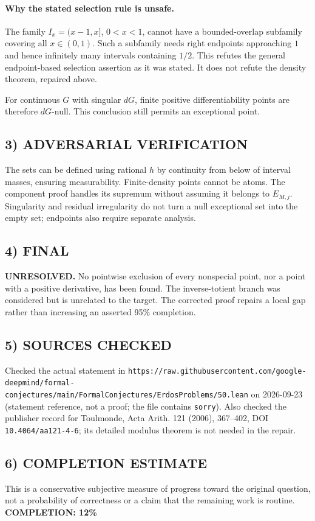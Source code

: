 \paragraph{Why the stated selection rule is unsafe.}
The family $I_x=(x-1,x]$, $0<x<1$, cannot have a bounded-overlap subfamily covering all $x\in(0,1)$. Such a subfamily needs right endpoints approaching $1$ and hence infinitely many intervals containing $1/2$. This refutes the general endpoint-based selection assertion as it was stated. It does not refute the density theorem, repaired above.

For continuous $G$ with singular $dG$, finite positive differentiability points are therefore $dG$-null. This conclusion still permits an exceptional point.
\subsection{3) ADVERSARIAL VERIFICATION}
The sets can be defined using rational $h$ by continuity from below of interval masses, ensuring measurability. Finite-density points cannot be atoms. The component proof handles its supremum without assuming it belongs to $E_{M,j}$. Singularity and residual irregularity do not turn a null exceptional set into the empty set; endpoints also require separate analysis.
\subsection{4) FINAL}
\textbf{UNRESOLVED.}
No pointwise exclusion of every nonspecial point, nor a point with a positive derivative, has been found. The inverse-totient branch was considered but is unrelated to the target. The corrected proof repairs a local gap rather than increasing an asserted 95\% completion.
\subsection{5) SOURCES CHECKED}
Checked the actual statement in \texttt{https://raw.githubusercontent.com/google-deepmind/formal-conjectures/main/FormalConjectures/ErdosProblems/50.lean} on 2026-09-23 (statement reference, not a proof; the file contains \texttt{sorry}). Also checked the publisher record for Toulmonde, Acta Arith. 121 (2006), 367--402, DOI \texttt{10.4064/aa121-4-6}; its detailed modulus theorem is not needed in the repair.
\subsection{6) COMPLETION ESTIMATE}
This is a conservative subjective measure of progress toward the original question, not a probability of correctness or a claim that the remaining work is routine.
\textbf{COMPLETION: 12\%}
